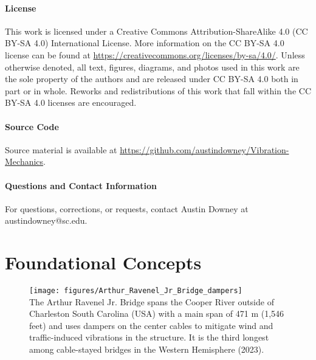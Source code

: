 \documentclass[12pt,letter]{article}
\begin{document}
\pagebreak

\subsection{License}
This work is licensed under a Creative Commons Attribution-ShareAlike 4.0 (CC BY-SA 4.0) International License. More information on the CC BY-SA 4.0 license can be found at  \url{https://creativecommons.org/licenses/by-sa/4.0/}. Unless otherwise denoted, all text, figures, diagrams, and photos used in this work are the sole property of the authors and are released under CC BY-SA 4.0 both in part or in whole. Reworks and redistributions of this work that fall within the CC BY-SA 4.0 licenses are encouraged.

\subsection{Source Code}
Source material is available at \url{https://github.com/austindowney/Vibration-Mechanics}.

\subsection{Questions and Contact Information}
For questions, corrections, or requests, contact Austin Downey at austindowney@sc.edu.


%
\pagebreak
%
%

\setcounter{page}{0}

\part{Foundational Concepts}

\setcounter{page}{0}
\setcounter{secnumdepth}{3} %

\begin{figure}[H]
	\centering
	\texttt{[image: figures/Arthur\_Ravenel\_Jr\_Bridge\_dampers]} \\
	The Arthur Ravenel Jr. Bridge spans the Cooper River outside of Charleston South Carolina (USA) with a main span of 471 m (1,546 feet) and uses dampers on the center cables to mitigate wind and traffic-induced vibrations in the structure. It is the third longest among cable-stayed bridges in the Western Hemisphere (2023).
\end{figure}
\end{document}
